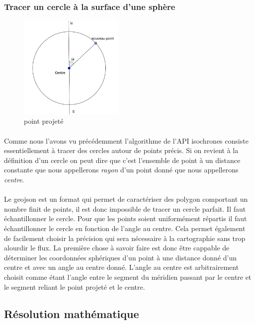 \documentclass[a4paper]{report}
\begin{document}
\subsubsection{Tracer un cercle à la surface d'une sphère}

\begin{figure}
		\includegraphics[width=5cm]{image/proj}
		\caption{point projeté}
		\label{point projeté}
\end{figure}

\paragraph{} Comme nous l'avons vu précédemment l'algorithme de l'API isochrones consiste essentiellement à tracer des cercles autour de points précis. Si on revient à la définition d'un cercle on peut dire que c'est l'ensemble de point à un distance constante que nous appellerons \emph{rayon} d'un point donné que nous appellerons \emph{centre}.

\paragraph{} Le geojson est un format qui permet de caractériser des polygon comportant un nombre finit de points, il est donc impossible de tracer un cercle parfait. Il faut échantillonner le cercle. Pour que les points soient uniformément répartis il faut échantillonner le cercle en fonction de l'angle au centre. Cela permet également de facilement choisir la précision qui sera nécessaire à la cartographie sans trop alourdir le flux. La première chose à savoir faire est donc être cappable de déterminer les coordonnées sphériques d'un point à une distance donné d'un centre et avec un angle au centre donné. L'angle au centre est arbitrairement choisit comme étant l'angle entre le segment du méridien passant par le centre et le segment reliant le point projeté et le centre.

\subsection{Résolution mathématique}
\end{document}
